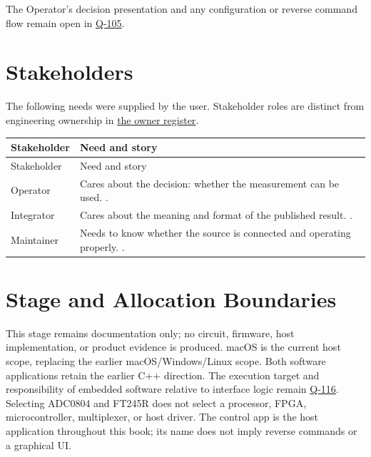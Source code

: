 The Operator's decision presentation and any configuration or reverse command
flow remain open in \hyperref[Question:Q-105]{Q-105}.

\section{Stakeholders}
\label{Section:MeasurementStakeholders}
The following needs were supplied by the user. Stakeholder roles are distinct from engineering ownership in \hyperref[Table:ProjectOwners]{the owner register}.

\small
\begin{tabularx}{\linewidth}{L{2.5cm}Y}
\caption{Measurement Stakeholder Needs\label{Table:StakeholderNeeds}}\\
\toprule
Stakeholder & Need and story\\\midrule
\endfirsthead
\toprule
Stakeholder & Need and story\\\midrule
\endhead
\bottomrule
\endlastfoot
{}\label{Stakeholder:Operator}Operator & Cares about the decision: whether the measurement can be used. .\\
\label{Stakeholder:Integrator}Integrator & Cares about the meaning and format of the published result. .\\
\label{Stakeholder:Maintainer}Maintainer & Needs to know whether the source is connected and operating properly. .\\
\end{tabularx}
\normalsize

\section{Stage and Allocation Boundaries}
This stage remains documentation only; no circuit, firmware, host implementation, or product evidence is produced. macOS is the current host scope, replacing the earlier macOS/Windows/Linux scope. Both software applications retain the earlier C++ direction. The execution target and responsibility of embedded software relative to interface logic remain \hyperref[Question:Q-116]{Q-116}. Selecting ADC0804 and FT245R does not select a processor, FPGA, microcontroller, multiplexer, or host driver. The control app is the host application throughout this book; its name does not imply reverse commands or a graphical UI.
